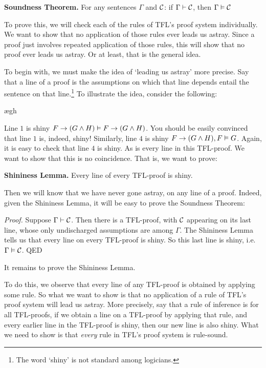 \begin{factoidboxe}\textbf{Soundness Theorem.} For any sentences $\Gamma$ and $\mathcal{C}$: if $\Gamma\vdash\mathcal{C}$, then $\Gamma \vDash\mathcal{C}$
\end{factoidboxe}

To prove this, we will check each of the rules of TFL's proof system individually. We want to show that no application of those rules ever leads us astray. Since a proof just involves repeated application of those rules, this will show that no proof ever leads us astray. Or at least, that is the general idea.

To begin with, we must make the idea of `leading us astray' more precise. Say that a line of a proof is  \ifeff{} the assumptions on which that line depends entail the sentence on that line.\footnote{The word `shiny' is not standard among logicians.} To illustrate the idea, consider the following:
	\begin{fitchproof}
		\PR
		\open
			\AS
			\ae{gh}
		\close
	\end{fitchproof}\noindent\noindent
Line $1$ is shiny \ifeff{} $F \rightarrow (G \wedge H) \vDash F \rightarrow (G \wedge H)$. You should be easily convinced that line $1$ is, indeed, shiny! Similarly, line $4$ is shiny \ifeff{} $F \rightarrow (G \wedge H), F \vDash G$. Again, it is easy to check that line $4$ is shiny. As is every line in this TFL-proof. We want to show that this is no coincidence. That is, we want to prove:
	\begin{factoidboxe}\textbf{Shininess Lemma.}
		Every line of every TFL-proof is shiny.
	\end{factoidboxe}\noindent
Then we will know that we have never gone astray, on any line of a proof. Indeed, given the Shininess Lemma, it will be easy to prove the Soundness Theorem:

\emph{Proof.} Suppose $\Gamma \vdash \mathcal{C}$. Then there is a TFL-proof, with $\mathcal{C}$ appearing on its last line, whose only undischarged assumptions are among $\Gamma$. The Shininess Lemma tells us that every line on every TFL-proof is shiny. So this last line is shiny, i.e.\ $\Gamma \vDash \mathcal{C}$. QED

It remains to prove the Shininess Lemma.

To do this, we observe that every line of any TFL-proof is obtained by applying some rule. So what we want to show is that no application of a rule of TFL's proof system will lead us astray. More precisely, say that a rule of inference is  \emph{\ifeff} for all TFL-proofs, if we obtain a line on a TFL-proof by applying that rule, and every earlier line in the TFL-proof is shiny, then our new line is also shiny. What we need to show is that \emph{every} rule in TFL's proof system is rule-sound.

